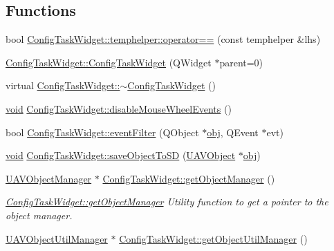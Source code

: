 \subsection*{Functions}
\begin{DoxyCompactItemize}
\item 
bool \hyperlink{group___u_a_v_object_widget_utils_gaf38e83f721ec231506c2aa0bd3268280}{Config\-Task\-Widget\-::temphelper\-::operator==} (const temphelper \&lhs)
\item 
\hyperlink{group___u_a_v_object_widget_utils_ga8164338f4928bd3afd984eeda276f276}{Config\-Task\-Widget\-::\-Config\-Task\-Widget} (Q\-Widget $\ast$parent=0)
\item 
virtual \hyperlink{group___u_a_v_object_widget_utils_ga40fc17c487f66c2cbcd9aa678c6f20dd}{Config\-Task\-Widget\-::$\sim$\-Config\-Task\-Widget} ()
\item 
\hyperlink{group___u_a_v_objects_plugin_ga444cf2ff3f0ecbe028adce838d373f5c}{void} \hyperlink{group___u_a_v_object_widget_utils_gaf42e971c9cd69919e3b05ed25643d516}{Config\-Task\-Widget\-::disable\-Mouse\-Wheel\-Events} ()
\item 
bool \hyperlink{group___u_a_v_object_widget_utils_gae5859445d40d8a43d5fd91927dd56ba9}{Config\-Task\-Widget\-::event\-Filter} (Q\-Object $\ast$\hyperlink{glext_8h_a0c0d4701a6c89f4f7f0640715d27ab26}{obj}, Q\-Event $\ast$evt)
\item 
\hyperlink{group___u_a_v_objects_plugin_ga444cf2ff3f0ecbe028adce838d373f5c}{void} \hyperlink{group___u_a_v_object_widget_utils_ga48cc77073a67c1e1945a0625f27d1519}{Config\-Task\-Widget\-::save\-Object\-To\-S\-D} (\hyperlink{class_u_a_v_object}{U\-A\-V\-Object} $\ast$\hyperlink{glext_8h_a0c0d4701a6c89f4f7f0640715d27ab26}{obj})
\item 
\hyperlink{class_u_a_v_object_manager}{U\-A\-V\-Object\-Manager} $\ast$ \hyperlink{group___u_a_v_object_widget_utils_ga516ee05a73ac3c7c9e6132b0d7294b4a}{Config\-Task\-Widget\-::get\-Object\-Manager} ()
\begin{DoxyCompactList}\small\item\em \hyperlink{group___u_a_v_object_widget_utils_ga516ee05a73ac3c7c9e6132b0d7294b4a}{Config\-Task\-Widget\-::get\-Object\-Manager} Utility function to get a pointer to the object manager. \end{DoxyCompactList}\item 
\hyperlink{class_u_a_v_object_util_manager}{U\-A\-V\-Object\-Util\-Manager} $\ast$ \hyperlink{group___u_a_v_object_widget_utils_gadefdec77400ea7aaed02de03fa044b7a}{Config\-Task\-Widget\-::get\-Object\-Util\-Manager} ()

\end{DoxyCompactItemize}
